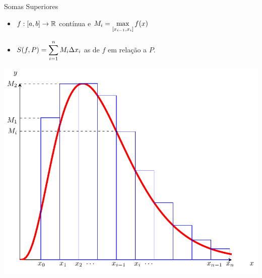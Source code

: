 \begin{frame}[label=def_integral]{Somas Superiores}
	\begin{itemize}
		\item $f:[a,b]\to \mathbb{R}$ contínua e $M_i=\displaystyle\max_{[x_{i-1},x_i]}f(x)$
		
		\item $S(f,P)=\displaystyle\sum_{i=1}^{n}M_i\Delta x_i$ as  de $f$ em relação a $P$.
	\end{itemize}
	\begin{center}
		\includegraphics[scale=0.3]{som-sup.png}
	\end{center}
\end{frame}

